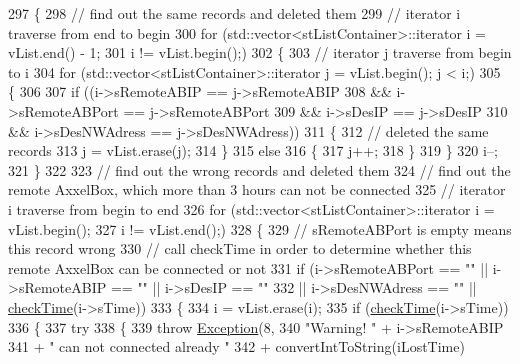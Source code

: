 \begin{DoxyCode}
297 \{
298 \textcolor{comment}{// find out the same records and deleted them}
299 \textcolor{comment}{// iterator i traverse from end to begin}
300     \textcolor{keywordflow}{for} (std::vector<stListContainer>::iterator i = vList.end() - 1;
301             i != vList.begin();)
302     \{
303         \textcolor{comment}{// iterator j traverse from begin to i}
304         \textcolor{keywordflow}{for} (std::vector<stListContainer>::iterator j = vList.begin(); j < i;)
305         \{
306 
307             \textcolor{keywordflow}{if} ((i->sRemoteABIP == j->sRemoteABIP
308                     && i->sRemoteABPort == j->sRemoteABPort
309                     && i->sDesIP == j->sDesIP
310                     && i->sDesNWAdress == j->sDesNWAdress))
311             \{
312                 \textcolor{comment}{// deleted the same records}
313                 j = vList.erase(j);
314             \}
315             \textcolor{keywordflow}{else}
316             \{
317                 j++;
318             \}
319         \}
320         i--;
321     \}
322 
323 \textcolor{comment}{// find out the wrong records and deleted them}
324 \textcolor{comment}{// find out the remote AxxelBox, which more than 3 hours can not be connected}
325 \textcolor{comment}{// iterator i traverse from begin to end}
326     \textcolor{keywordflow}{for} (std::vector<stListContainer>::iterator i = vList.begin();
327             i != vList.end();)
328     \{
329         \textcolor{comment}{// sRemoteABPort is empty means this record wrong}
330         \textcolor{comment}{// call checkTime in order to determine whether this remote AxxelBox can be connected or not}
331         \textcolor{keywordflow}{if} (i->sRemoteABPort == \textcolor{stringliteral}{""} || i->sRemoteABIP == \textcolor{stringliteral}{""} || i->sDesIP == \textcolor{stringliteral}{""}
332                 || i->sDesNWAdress == \textcolor{stringliteral}{""} || \hyperlink{classServer_a5443bb5b2850f0c3b6b21212adc4fa07}{checkTime}(i->sTime))
333         \{
334             i = vList.erase(i);
335             \textcolor{keywordflow}{if} (\hyperlink{classServer_a5443bb5b2850f0c3b6b21212adc4fa07}{checkTime}(i->sTime))
336             \{
337                 \textcolor{keywordflow}{try}
338                 \{
339                     \textcolor{keywordflow}{throw} \hyperlink{classException}{Exception}(8,
340                             \textcolor{stringliteral}{"Warning! "} + i->sRemoteABIP
341                                     + \textcolor{stringliteral}{" can not connected already "}
342                                     + convertIntToString(iLostTime)

\end{DoxyCode}
